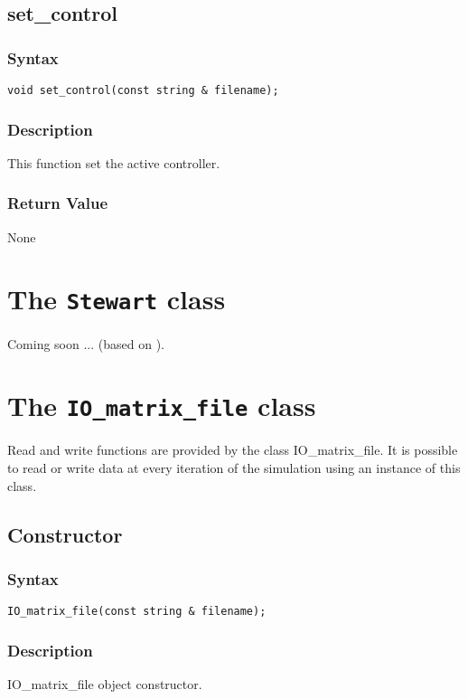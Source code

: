 \documentclass[11pt,fleqn,letterpaper]{report}
\begin{document}
\subsection*{set\_control}
\subsubsection*{Syntax}
\begin{verbatim}
void set_control(const string & filename);
\end{verbatim}

\subsubsection*{Description}   
This function set the active controller.
\subsubsection*{Return Value}

None

\newpage

\section{The \texttt{Stewart} class}

Coming soon ... (based on \cite{Harib03}).

\newpage

\section{The \texttt{IO\_matrix\_file} class}

Read and write functions are provided by the class IO\_matrix\_file.
It is possible to read or write data at every iteration of the
simulation using an instance of this class.

\subsection*{Constructor}
\subsubsection*{Syntax}
\begin{verbatim}
IO_matrix_file(const string & filename);
\end{verbatim}

\subsubsection*{Description}   
IO\_matrix\_file object constructor.
\end{document}
